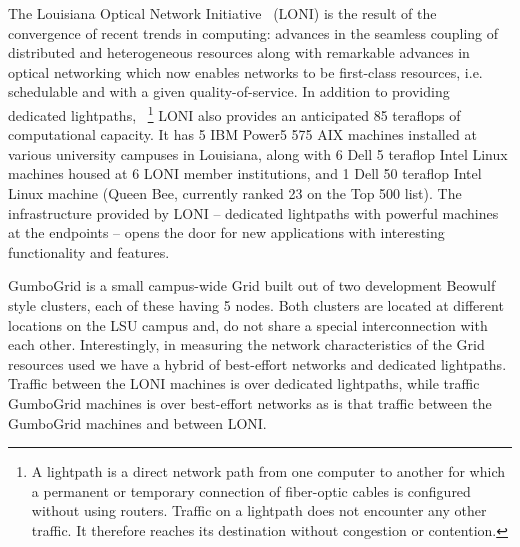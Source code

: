 \documentclass[conference,final]{IEEEtran}
\begin{document}
The Louisiana Optical Network Initiative~\cite{LONI_web} (LONI) is the
result of the convergence of recent trends in computing: advances in
the seamless coupling of distributed and heterogeneous resources along
with remarkable advances in optical networking which now enables
networks to be first-class resources, i.e. schedulable and with a
given quality-of-service.  In addition to providing dedicated
lightpaths, ~\footnote{A lightpath is a direct network path from one
  computer to another for which a permanent or temporary connection of
  fiber-optic cables is configured without using routers. Traffic on a
  lightpath does not encounter any other traffic. It therefore reaches
  its destination without congestion or contention.}  LONI also
provides an anticipated 85 teraflops of computational capacity. It has
5 IBM Power5 575 AIX machines installed at various university campuses
in Louisiana, along with 6 Dell 5 teraflop Intel Linux machines housed
at 6 LONI member institutions, and 1 Dell 50 teraflop Intel Linux
machine (Queen Bee, currently ranked 23 on the Top 500 list). The
infrastructure provided by LONI -- dedicated lightpaths with powerful
machines at the endpoints -- opens the door for new applications with
interesting functionality and features.


GumboGrid is a small campus-wide Grid built out of two development
Beowulf style clusters, each of these having 5 nodes.  Both clusters
are located at different locations on the LSU campus and, do not share
a special interconnection with each other.  Interestingly, in
measuring the network characteristics of the Grid resources used we
have a hybrid of best-effort networks and dedicated lightpaths.
Traffic between the LONI machines is over dedicated lightpaths, while
traffic GumboGrid machines is over best-effort networks as is that
traffic between the GumboGrid machines and between LONI.


\end{document}
